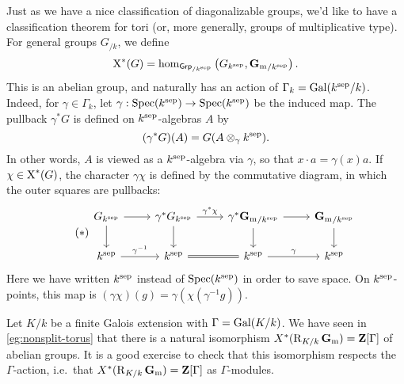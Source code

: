 Just as we have a nice classification of diagonalizable groups, we'd like to 
have a classification theorem for tori (or, more generally, groups of 
multiplicative type). For general groups $G_{/k}$, we define 
\[
  \operatorname{X}^\ast(G) = \hom_{\mathsf{Grp}_{/k^{\mathrm{sep}}}}\left(G_{k^{\mathrm{sep}}},{\mathbf{G}_\mathrm{m}}_{/k^{\mathrm{sep}}}\right) .
\]
This is an abelian group, and naturally has an action of 
$\Gamma_k=\operatorname{Gal}(k^{\mathrm{sep}}/k)$. Indeed, for $\gamma\in \Gamma_k$, let 
$\gamma:\operatorname{Spec}(k^{\mathrm{sep}})\to \operatorname{Spec}(k^{\mathrm{sep}})$ be the 
induced map. The pullback $\gamma^\ast G$ is defined on 
$k^{\mathrm{sep}}$-algebras $A$ by 
\[
  (\gamma^\ast G)(A)=G(A\otimes_\gamma k^{\mathrm{sep}}). 
\]
In other words, $A$ is viewed as a $k^{\mathrm{sep}}$-algebra via 
$\gamma$, so that $x\cdot a = \gamma(x) a$. If $\chi\in \operatorname{X}^\ast(G)$, 
the character $\gamma\chi$ is defined by the commutative diagram, in which 
the outer squares are pullbacks: 
\begin{equation}\tag{$\ast$}\label{eq:galois-char}
\begin{tikzcd}
  G_{k^\separable} \ar[d] \ar[r] 
    & \gamma^\ast G_{k^\separable} \ar[d] \ar[r, "\gamma^\ast \chi"]
    & \gamma^\ast {\Gm}_{/k^\separable} \ar[r] \ar[d] 
    & {\Gm}_{/k^\separable} \ar[d] \\
  k^\separable \ar[r, "\gamma^{-1}"]
    & k^\separable \ar[r, equal] 
    & k^\separable \ar[r, "\gamma"] 
    & k^\separable 
\end{tikzcd}
\end{equation}
Here we have written $k^{\mathrm{sep}}$ instead of $\operatorname{Spec}(k^{\mathrm{sep}})$ in 
order to save space. On $k^{\mathrm{sep}}$-points, this map is 
$(\gamma\chi)(g) = \gamma(\chi(\gamma^{-1} g))$. 

\begin{example}
Let $K/k$ be a finite Galois extension with $\Gamma=\operatorname{Gal}(K/k)$. We have 
seen in \autoref{eg:nonsplit-torus} that there is a natural isomorphism 
$X^\ast(\operatorname{R}_{K/k}\mathbf{G}_\mathrm{m}) = \mathbf{Z}[\Gamma]$ of abelian groups. It is a good 
exercise to check that this isomorphism respects the $\Gamma$-action, 
i.e.~that $X^\ast(\operatorname{R}_{K/k}\mathbf{G}_\mathrm{m})=\mathbf{Z}[\Gamma]$ as $\Gamma$-modules. 
\end{example}

